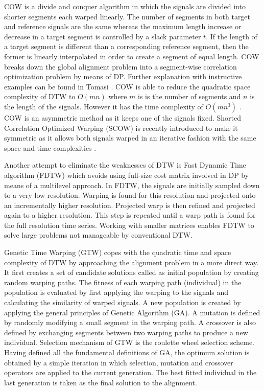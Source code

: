 \documentclass[number,1p,12pt]{elsarticle}
\begin{document}
COW is a divide and conquer algorithm in which the signals are divided into shorter segments each warped linearly. The number of segments in both target and reference signals are the same whereas the maximum length increase or decrease in a target segment is controlled by a slack parameter $t$. If the length of a target segment is different than a corresponding reference segment, then the former is linearly interpolated in order to create a segment of equal length. COW breaks down the global alignment problem into a segment-wise correlation optimization problem by means of DP. Further explanation with instructive examples can be found in Tomasi \cite{Tomasi2004}. COW is able to reduce the quadratic space complexity of DTW to $O(mn)$ where $m$ is is the number of segments and $n$ is the length of the signals. However it has the time complexity of $O(mn^3)$ \cite{Smith2009}. COW is an asymmetric method as it keeps one of the signals fixed. Shorted Correlation Optimized Warping (SCOW) is recently introduced to make it symmetric as it allows both signals warped in an iterative fashion with the same space and time complexities \cite{Smith2009A}. 

Another attempt to eliminate the weaknesses of DTW is Fast Dynamic Time algorithm (FDTW) which avoids using full-size cost matrix involved in DP by means of a multilevel approach. In FDTW, the signals are initially sampled down to a very low resolution. Warping is found for this resolution and projected onto an incrementally higher resolution. Projected warp is then refined and projected again to a higher resolution. This step is repeated until a warp path is found for the full resolution time series. Working with smaller matrices enables FDTW to solve large problems not manageable by conventional DTW. 

Genetic Time Warping (GTW) copes with the quadratic time and space complexity of DTW by approaching the alignment problem in a more direct way. It first creates a set of candidate solutions called as initial population by creating random warping paths. The fitness of each warping path (individual) in the population is evaluated by first applying the warping to the signals and calculating the similarity of warped signals. A new population is created by applying the general principles of Genetic Algorithm (GA). A mutation is defined by randomly modifying a small segment in the warping path. A crossover is also defined by exchanging segments between two warping paths to produce a new individual. Selection mechanism of GTW is the roulette wheel selection scheme. Having defined all the fundamental definitions of GA, the optimum solution is obtained by a simple iteration in which selection, mutation and crossover operators are applied to the current generation. The best fitted individual in the last generation is taken as the final solution to the alignment. 
\end{document}
